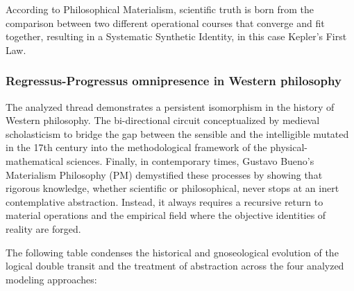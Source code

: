 \documentclass[11pt, a4paper]{article}
\begin{document}
According to Philosophical Materialism, scientific truth is born from the comparison between two different operational courses that converge and fit together, resulting in a Systematic Synthetic Identity, in this case Kepler's First Law.


\subsubsection*{Regressus-Progressus omnipresence in Western philosophy}

The analyzed thread demonstrates a persistent isomorphism in the history of Western philosophy. The bi-directional circuit conceptualized by medieval scholasticism to bridge the gap between the sensible and the intelligible mutated in the 17th century into the methodological framework of the physical-mathematical sciences. Finally, in contemporary times, Gustavo Bueno's Materialism Philosophy (PM) demystified these processes by showing that rigorous knowledge, whether scientific or philosophical, never stops at an inert contemplative abstraction. Instead, it always requires a recursive return to material operations and the empirical field where the objective identities of reality are forged.

The following table condenses the historical and gnoseological evolution of the logical double transit and the treatment of abstraction across the four analyzed modeling approaches:
\end{document}
